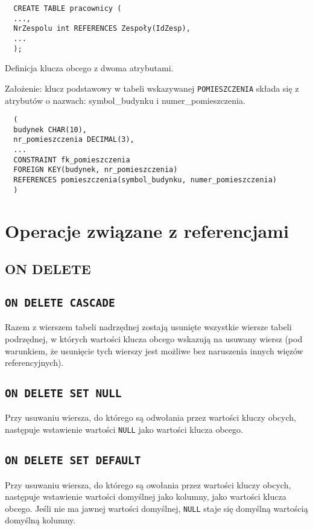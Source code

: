 \documentclass[a4paper]{article}
\begin{document}
\begin{verbatim}
  CREATE TABLE pracownicy (
  ...,
  NrZespolu int REFERENCES Zespoły(IdZesp),
  ...
  );
\end{verbatim}

Definicja klucza obcego z dwoma atrybutami.

Założenie: klucz podstawowy w tabeli wskazywanej {\tt POMIESZCZENIA} składa się z atrybutów o nazwach: symbol\_budynku i numer\_pomieszczenia.

\begin{verbatim}
  (
  budynek CHAR(10),
  nr_pomieszczenia DECIMAL(3),
  ...
  CONSTRAINT fk_pomieszczenia
  FOREIGN KEY(budynek, nr_pomieszczenia)
  REFERENCES pomieszczenia(symbol_budynku, numer_pomieszczenia)
  )
\end{verbatim}

\section{Operacje związane z referencjami}

\subsection{ON DELETE}

\subsection{\tt ON DELETE CASCADE}

Razem z wierszem tabeli nadrzędnej zostają usunięte wszystkie wiersze tabeli podrzędnej, w których wartości klucza obcego wskazują na usuwany wiersz (pod warunkiem, że usunięcie tych wierszy jest możliwe bez naruszenia innych więzów referencyjnych).

\subsection{\tt ON DELETE SET NULL}

Przy usuwaniu wiersza, do którego są odwołania przez wartości kluczy obcych, następuje wstawienie wartości \texttt{NULL} jako wartości klucza obcego.

\subsection{\tt ON DELETE SET DEFAULT}

Przy usuwaniu wiersza, do którego są owołania przez wartości kluczy obcych, następuje wstawienie wartości domyślnej jako kolumny, jako wartości klucza obcego. Jeśli nie ma jawnej wartości domyślnej, \texttt{NULL} staje się domyślną wartością domyślną kolumny.
\end{document}
